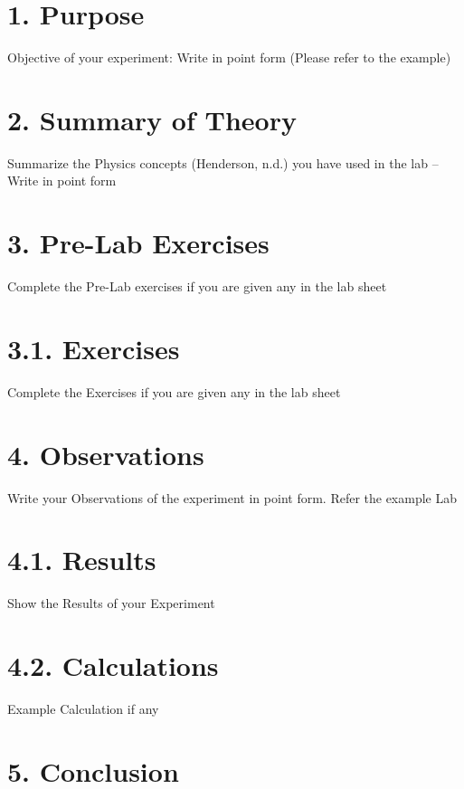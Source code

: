\documentclass[a4paper,12pt]{article}
\begin{document}
\newpage
\vspace*{12pt}

\section*{1. Purpose}

Objective of your experiment: Write in point form (Please refer to the example)


\section*{2. Summary of Theory}

Summarize the Physics concepts (Henderson, n.d.) you have used in the lab – Write in point form


\section*{3. Pre-Lab Exercises} 

Complete the Pre-Lab exercises if you are given any in the lab sheet


\section*{3.1. Exercises}

Complete the Exercises if you are given any in the lab sheet


\section*{4. Observations}

Write your Observations of the experiment in point form. Refer the example Lab


\section*{4.1. Results}

Show the Results of your Experiment


\section*{4.2. Calculations}

Example Calculation if  any


\section*{5. Conclusion}
\end{document}
